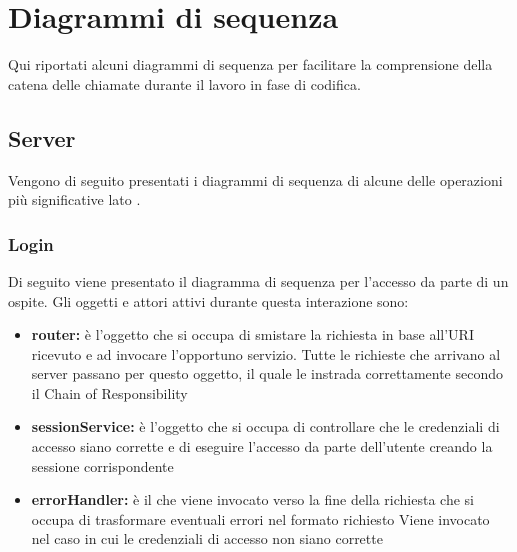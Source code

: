 \documentclass[12pt,a4paper]{article}
\begin{document}
\newpage

\section{Diagrammi di sequenza}
Qui riportati alcuni diagrammi di sequenza per facilitare la comprensione della catena delle chiamate durante il lavoro in fase di codifica.

\subsection{Server}
Vengono di seguito presentati i diagrammi di sequenza di alcune delle operazioni più significative lato .

\subsubsection{Login}
Di seguito viene presentato il diagramma di sequenza per l'accesso da parte di un ospite. Gli oggetti e attori attivi durante questa interazione sono:

\begin{itemize}
	\item \textbf{router:} è l'oggetto che si occupa di smistare la richiesta in base all’URI ricevuto e ad invocare l’opportuno servizio. Tutte le richieste che arrivano al server passano per questo oggetto, il quale le instrada correttamente secondo il  Chain of Responsibility
	\item \textbf{sessionService:} è l'oggetto che si occupa di controllare che le credenziali di accesso siano corrette e di eseguire l'accesso da parte dell'utente creando la sessione corrispondente
	\item \textbf{errorHandler:} è il  che viene invocato verso la fine della richiesta che si occupa di trasformare eventuali errori nel formato  richiesto Viene invocato nel caso in cui le credenziali di accesso non siano corrette
\end{itemize}
\end{document}
